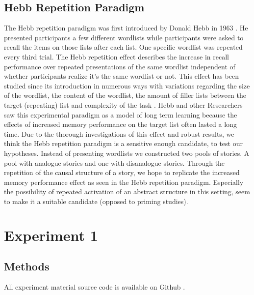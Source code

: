 \documentclass[a4paper,man,natbib,floatsintext,import]{apa6}
\begin{document}
\subsection{Hebb Repetition Paradigm}
The Hebb repetition paradigm was first introduced by Donald Hebb in 1963 \citep{Lafond2010}. He presented participants a few different wordlists while participants were asked to recall the items on those lists after each list. One specific wordlist was repeated every third trial. The Hebb repetition effect describes the increase in recall performance over repeated presentations of the same wordlist independent of whether participants realize it's the same wordlist or not. This effect has been studied since its introduction in numerous ways with variations regarding the size of the wordlist, the content of the wordlist, the amount of filler lists between the target (repeating) list  and complexity of the task \citep{Lafond2010,Oberauer2015}.
Hebb and other Researchers saw this experimental paradigm as a model of long term learning because the effects of increased memory performance on the target list often lasted a long time. Due to the thorough investigations of this effect and robust results, we think the Hebb repetition paradigm is a sensitive enough candidate, to test our hypotheses. Instead of presenting wordlists we constructed two pools of  stories. A pool with analogue stories and one with disanalogue stories. Through the repetition of the causal structure of a story, we hope to replicate the increased memory performance effect as seen in the Hebb repetition paradigm. Especially the possibility of repeated activation of an abstract structure in this setting, seem to make it a suitable candidate (opposed to priming studies).

\newpage
\section{Experiment 1}
\subsection{Methods}
All experiment material source code is available on Github \citep{Oesch2016}.
\end{document}
